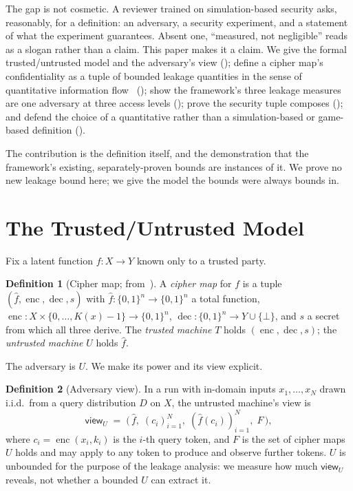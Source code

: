 \documentclass[11pt]{article}
\newcommand{\fhat}{\hat{f}}
\newcommand{\enc}{\operatorname{enc}}
\newcommand{\dec}{\operatorname{dec}}
\newcommand{\B}{\{0,1\}}
\theoremstyle{definition}
\newtheorem{definition}{Definition}
\theoremstyle{plain}
\theoremstyle{remark}
\begin{document}
The gap is not cosmetic. A reviewer trained on simulation-based security asks,
reasonably, for a definition: an adversary, a security experiment, and a
statement of what the experiment guarantees. Absent one, ``measured, not
negligible'' reads as a slogan rather than a claim. This paper makes it a claim.
We give the formal trusted/untrusted model and the adversary's view
(); define a cipher map's confidentiality as a tuple of bounded
leakage quantities in the sense of quantitative information flow~%
\cite{smith2009foundations,alvim2020science} (); show the
framework's three leakage measures are one adversary at three access levels
(); prove the security tuple composes ();
and defend the choice of a quantitative rather than a simulation-based or
game-based definition ().

The contribution is the definition itself, and the demonstration that the
framework's existing, separately-proven bounds are instances of it. We prove no
new leakage bound here; we give the model the bounds were always bounds in.

\section{The Trusted/Untrusted Model}
\label{sec:model}

Fix a latent function $f : X \to Y$ known only to a trusted party.

\begin{definition}[Cipher map; from~\cite{towell2026cipher}]
\label{def:cipher-map}
A \emph{cipher map} for $f$ is a tuple $(\fhat, \enc, \dec, s)$ with
$\fhat : \B^n \to \B^n$ a total function, $\enc : X \times \{0, \ldots,
K(x)-1\} \to \B^n$, $\dec : \B^n \to Y \cup \{\bot\}$, and $s$ a secret from
which all three derive. The \emph{trusted machine} $T$ holds $(\enc, \dec, s)$;
the \emph{untrusted machine} $U$ holds $\fhat$.
\end{definition}

The adversary is $U$. We make its power and its view explicit.

\begin{definition}[Adversary view]
\label{def:view}
In a run with in-domain inputs $x_1, \ldots, x_N$ drawn i.i.d.\ from a query
distribution $D$ on $X$, the untrusted machine's view is
\[
  \mathsf{view}_U \;=\; \bigl(\, \fhat,\; (c_i)_{i=1}^N,\; (\fhat(c_i))_{i=1}^N,\;
  F \,\bigr),
\]
where $c_i = \enc(x_i, k_i)$ is the $i$-th query token, and $F$ is the set of
cipher maps $U$ holds and may apply to any token to produce and observe further
tokens. $U$ is unbounded for the purpose of the leakage analysis: we measure how
much $\mathsf{view}_U$ reveals, not whether a bounded $U$ can extract it.
\end{definition}
\end{document}
